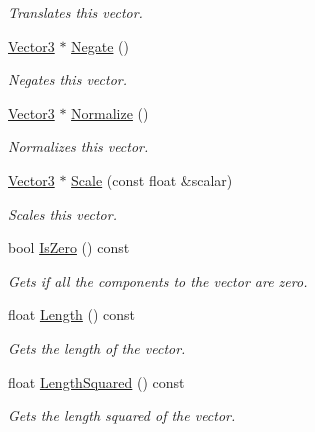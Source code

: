 \begin{DoxyCompactItemize}
\begin{DoxyCompactList}\small\item\em Translates this vector. \end{DoxyCompactList}\item 
\hyperlink{class_flounder_1_1_vector3}{Vector3} $\ast$ \hyperlink{class_flounder_1_1_vector3_a627dc89610d8fd84f07c637e9f3c8b91}{Negate} ()
\begin{DoxyCompactList}\small\item\em Negates this vector. \end{DoxyCompactList}\item 
\hyperlink{class_flounder_1_1_vector3}{Vector3} $\ast$ \hyperlink{class_flounder_1_1_vector3_a986eea720eeb8e45b65e9fb445cae3e4}{Normalize} ()
\begin{DoxyCompactList}\small\item\em Normalizes this vector. \end{DoxyCompactList}\item 
\hyperlink{class_flounder_1_1_vector3}{Vector3} $\ast$ \hyperlink{class_flounder_1_1_vector3_a96214106c5fd576a2778e525def05598}{Scale} (const float \&scalar)
\begin{DoxyCompactList}\small\item\em Scales this vector. \end{DoxyCompactList}\item 
bool \hyperlink{class_flounder_1_1_vector3_a6eac37ebdd397d074d54199b0524704f}{Is\+Zero} () const
\begin{DoxyCompactList}\small\item\em Gets if all the components to the vector are zero. \end{DoxyCompactList}\item 
float \hyperlink{class_flounder_1_1_vector3_a0be693418e56fc0fb9a3425985a4771f}{Length} () const
\begin{DoxyCompactList}\small\item\em Gets the length of the vector. \end{DoxyCompactList}\item 
float \hyperlink{class_flounder_1_1_vector3_ae4226363d9a8ca40811a6c750d12a6cf}{Length\+Squared} () const
\begin{DoxyCompactList}\small\item\em Gets the length squared of the vector. \end{DoxyCompactList}\end{DoxyCompactItemize}

